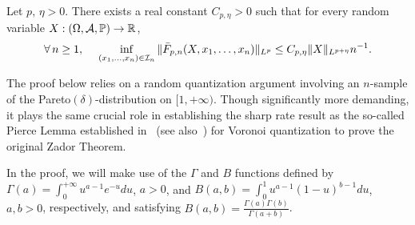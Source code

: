 
\begin{thm}\label{Pierce0}Let $p,\,\eta>0$. There exists a real
constant $C_{p,\eta}>0$
such that for every random variable  $X:(\Omega,{\cal A},\mathbb{P})\to \mathbb{R}$,
\[
\forall\, n\ge 1,\;\quad
\inf_{(x_1,\ldots,x_n)\in {\cal I}_n}\|\bar
F_{p,n}(X, x_1,\ldots,x_n)\|_{L^p} \le C_{p,\eta}\|X\|_{L^{p+\eta}}n^{-1}.
\] 
\end{thm}


The proof below relies  on a random quantization argument involving an $n$-sample of the Pareto$(\delta)$-distribution on $[1,+\infty)$. Though significantly more demanding, it plays the same  crucial role in establishing the sharp rate result as the so-called Pierce Lemma established in~\cite{meanRegular} (see also~\cite{Foundations}) for Voronoi quantization    to prove the original Zador Theorem.  

In the proof, we will make use of the $\Gamma$ and $B$ functions defined by
$\Gamma(a)=\int_0^{+\infty}u^{a-1}e^{-u}du$, $a>0$, and
$B(a,b) =\int_0^1u^{a-1}(1-u)^{b-1}du$, $a,b>0$,  respectively, and satisfying $B(a,b)= \frac{\Gamma(a)\Gamma(b)}{\Gamma(a+b)}$.


